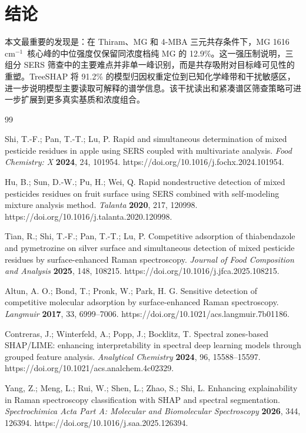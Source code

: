 \documentclass[preprint,12pt]{elsarticle}
\newcommand{\cmone}{cm$^{-1}$}
\begin{document}
\section{结论}

本文最重要的发现是：在 Thiram、MG 和 4-MBA 三元共存条件下，MG 1616 \cmone\ 核心峰的中位强度仅保留同浓度档纯 MG 的 12.9\%。这一强压制说明，三组分 SERS 筛查中的主要难点并非单一峰识别，而是共存吸附对目标峰可见性的重塑。TreeSHAP 将 91.2\% 的模型归因权重定位到已知化学峰带和干扰敏感区，进一步说明模型主要读取可解释的谱学信息。该干扰读出和紧凑谱区筛查策略可进一步扩展到更多真实基质和浓度组合。

{\footnotesize
\begin{thebibliography}{99}

 Shi, T.-F.; Pan, T.-T.; Lu, P. Rapid and simultaneous determination of mixed pesticide residues in apple using SERS coupled with multivariate analysis. \textit{Food Chemistry: X} \textbf{2024}, 24, 101954. https://doi.org/10.1016/j.fochx.2024.101954.

 Hu, B.; Sun, D.-W.; Pu, H.; Wei, Q. Rapid nondestructive detection of mixed pesticides residues on fruit surface using SERS combined with self-modeling mixture analysis method. \textit{Talanta} \textbf{2020}, 217, 120998. https://doi.org/10.1016/j.talanta.2020.120998.

 Tian, R.; Shi, T.-F.; Pan, T.-T.; Lu, P. Competitive adsorption of thiabendazole and pymetrozine on silver surface and simultaneous detection of mixed pesticide residues by surface-enhanced Raman spectroscopy. \textit{Journal of Food Composition and Analysis} \textbf{2025}, 148, 108215. https://doi.org/10.1016/j.jfca.2025.108215.

 Altun, A. O.; Bond, T.; Pronk, W.; Park, H. G. Sensitive detection of competitive molecular adsorption by surface-enhanced Raman spectroscopy. \textit{Langmuir} \textbf{2017}, 33, 6999--7006. https://doi.org/10.1021/acs.langmuir.7b01186.

 Contreras, J.; Winterfeld, A.; Popp, J.; Bocklitz, T. Spectral zones-based SHAP/LIME: enhancing interpretability in spectral deep learning models through grouped feature analysis. \textit{Analytical Chemistry} \textbf{2024}, 96, 15588--15597. https://doi.org/10.1021/acs.analchem.4c02329.

 Yang, Z.; Meng, L.; Rui, W.; Shen, L.; Zhao, S.; Shi, L. Enhancing explainability in Raman spectroscopy classification with SHAP and spectral segmentation. \textit{Spectrochimica Acta Part A: Molecular and Biomolecular Spectroscopy} \textbf{2026}, 344, 126394. https://doi.org/10.1016/j.saa.2025.126394.


\end{thebibliography}}
\end{document}
